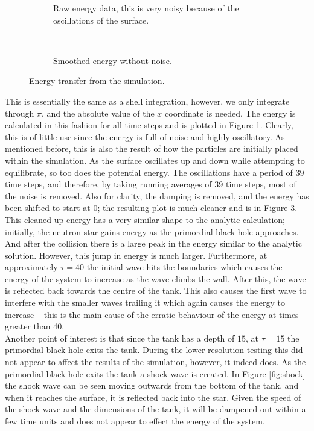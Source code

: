 \begin{figure}
\centering
\begin{subfigure}{\textwidth}

\caption{Raw energy data, this is very noisy because of the oscillations of the surface.}
\label{fig:badenergy}
\end{subfigure} \\
\begin{subfigure}{\textwidth}

\caption{Smoothed energy without noise.}
\label{fig:goodenergy}
\end{subfigure}
\caption[Energy transfer from the simulation]{Energy transfer from the simulation.}
\end{figure}

This is essentially the same as a shell integration, however, we only integrate through $\pi$, and the absolute value of the $x$ coordinate is needed. The energy is calculated in this fashion for all time steps and is plotted in Figure \ref{fig:badenergy}. Clearly, this is of little use since the energy is full of noise and highly oscillatory. As mentioned before, this is also the result of how the particles are initially placed within the simulation. As the surface oscillates up and down while attempting to equilibrate, so too does the potential energy. The oscillations have a period of 39 time steps, and therefore, by taking running averages of 39 time steps, most of the noise is removed. Also for clarity, the damping is removed, and the energy has been shifted to start at 0; the resulting plot is much cleaner and is in Figure \ref{fig:goodenergy}. \\

This cleaned up energy has a very similar shape to the analytic calculation; initially, the neutron star gains energy as the primordial black hole approaches. And after the collision there is a large peak in the energy similar to the analytic solution. However, this jump in energy is much larger. Furthermore, at approximately $\tau = 40$ the initial wave hits the boundaries which causes the energy of the system to increase as the wave climbs the wall. After this, the wave is reflected back towards the centre of the tank. This also causes the first wave to interfere with the smaller waves trailing it which again causes the energy to increase -- this is the main cause of the erratic behaviour of the energy at times greater than 40. \\

Another point of interest is that since the tank has a depth of $15$, at $\tau = 15$ the primordial black hole exits the tank. During the lower resolution testing this did not appear to affect the results of the simulation, however, it indeed does. As the primordial black hole exits the tank a shock wave is created. In Figure \ref{fig:shock} the shock wave can be seen moving outwards from the bottom of the tank, and when it reaches the surface, it is reflected back into the star. Given the speed of the shock wave and the dimensions of the tank, it will be dampened out within a few time units and does not appear to effect the energy of the system.

